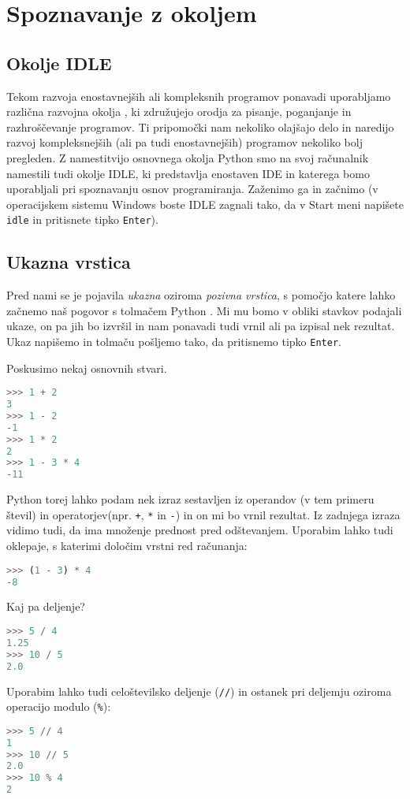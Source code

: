 \chapter{Spoznavanje z okoljem}

\section{Okolje IDLE}

Tekom razvoja enostavnejših ali kompleksnih programov ponavadi uporabljamo različna razvojna okolja , ki združujejo orodja za pisanje, poganjanje in razhroščevanje  programov. Ti pripomočki nam nekoliko olajšajo delo in naredijo razvoj kompleksnejših (ali pa tudi enostavnejših) programov nekoliko bolj pregleden. Z namestitvijo osnovnega okolja Python smo na svoj računalnik namestili tudi okolje IDLE, ki predstavlja enostaven IDE in katerega bomo uporabljali pri spoznavanju osnov programiranja. Zaženimo ga in začnimo (v operacijskem sistemu Windows boste IDLE zagnali tako, da v Start meni napišete \texttt{idle} in pritisnete tipko \texttt{Enter}).

\section{Ukazna vrstica}
Pred nami se je pojavila \emph{ukazna} oziroma \emph{pozivna vrstica}, s pomočjo katere lahko začnemo naš pogovor s tolmačem Python . Mi mu bomo v obliki stavkov podajali ukaze, on pa jih bo izvršil in nam ponavadi tudi vrnil ali pa izpisal nek rezultat. Ukaz napišemo in tolmaču pošljemo tako, da pritisnemo tipko \texttt{Enter}. 

Poskusimo nekaj osnovnih stvari.
\begin{lstlisting}[language=Python]
>>> 1 + 2
3
>>> 1 - 2
-1
>>> 1 * 2
2
>>> 1 - 3 * 4
-11
\end{lstlisting}
Python torej lahko podam nek izraz sestavljen iz operandov (v tem primeru števil) in operatorjev(npr. \texttt{+}, \texttt{*} in \texttt{-}) in on mi bo vrnil rezultat. Iz zadnjega izraza vidimo tudi, da ima množenje prednost pred odštevanjem. Uporabim lahko tudi oklepaje, s katerimi določim vrstni red računanja:
\begin{lstlisting}[language=Python]
>>> (1 - 3) * 4
-8
\end{lstlisting}
Kaj pa deljenje? 
\begin{lstlisting}[language=Python]
>>> 5 / 4
1.25
>>> 10 / 5
2.0
\end{lstlisting}
Uporabim lahko tudi celoštevilsko deljenje (\texttt{//}) in ostanek pri deljemju oziroma operacijo modulo (\texttt{\%}): 
\begin{lstlisting}[language=Python]
>>> 5 // 4
1
>>> 10 // 5
2.0
>>> 10 % 4
2
\end{lstlisting}

